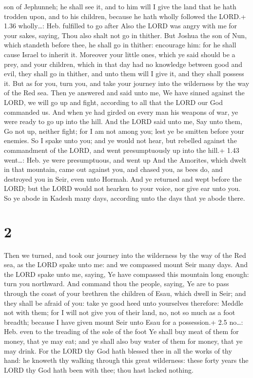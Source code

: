son of Jephunneh; he shall see it, and to him will I give the land that
he hath trodden upon, and to his children, because he hath wholly
followed the LORD.+ 1.36 wholly\ldots: Heb. fulfilled to go after
 Also the LORD was angry with me for your sakes, saying,
Thou also shalt not go in thither.  But Joshua the son of
Nun, which standeth before thee, he shall go in thither: encourage him:
for he shall cause Israel to inherit it.  Moreover your
little ones, which ye said should be a prey, and your children, which in
that day had no knowledge between good and evil, they shall go in
thither, and unto them will I give it, and they shall possess it.
 But as for you, turn you, and take your journey into the
wilderness by the way of the Red sea.  Then ye answered and
said unto me, We have sinned against the LORD, we will go up and fight,
according to all that the LORD our God commanded us. And when ye had
girded on every man his weapons of war, ye were ready to go up into the
hill.  And the LORD said unto me, Say unto them, Go not up,
neither fight; for I am not among you; lest ye be smitten before your
enemies.  So I spake unto you; and ye would not hear, but
rebelled against the commandment of the LORD, and went presumptuously up
into the hill.+ 1.43 went\ldots: Heb. ye were presumptuous, and went up
 And the Amorites, which dwelt in that mountain, came out
against you, and chased you, as bees do, and destroyed you in Seir, even
unto Hormah.  And ye returned and wept before the LORD; but
the LORD would not hearken to your voice, nor give ear unto you.
 So ye abode in Kadesh many days, according unto the days
that ye abode there.

\hypertarget{section-1}{%
\section{2}\label{section-1}}

 Then we turned, and took our journey into the wilderness by
the way of the Red sea, as the LORD spake unto me: and we compassed
mount Seir many days.  And the LORD spake unto me, saying,
 Ye have compassed this mountain long enough: turn you
northward.  And command thou the people, saying, Ye are to
pass through the coast of your brethren the children of Esau, which
dwell in Seir; and they shall be afraid of you: take ye good heed unto
yourselves therefore:  Meddle not with them; for I will not
give you of their land, no, not so much as a foot breadth; because I
have given mount Seir unto Esau for a possession.+ 2.5 no\ldots: Heb.
even to the treading of the sole of the foot  Ye shall buy
meat of them for money, that ye may eat; and ye shall also buy water of
them for money, that ye may drink.  For the LORD thy God
hath blessed thee in all the works of thy hand: he knoweth thy walking
through this great wilderness: these forty years the LORD thy God hath
been with thee; thou hast lacked nothing.

